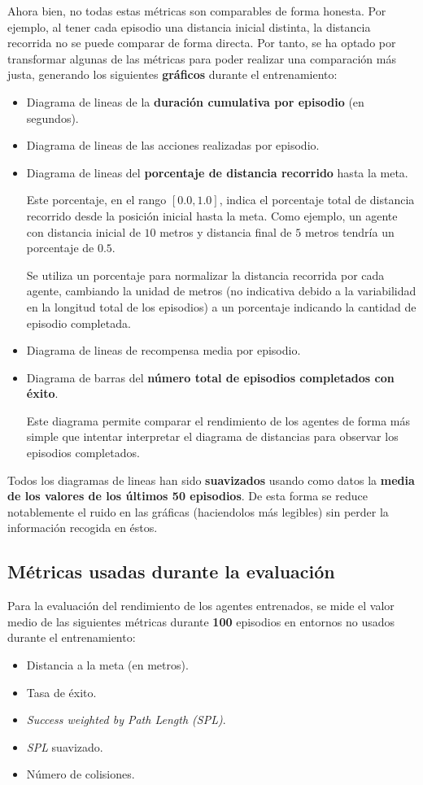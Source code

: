 Ahora bien, no todas estas métricas son comparables de forma honesta. Por ejemplo, al tener cada episodio una distancia inicial distinta, la distancia recorrida no se puede comparar de forma directa. Por tanto, se ha optado por transformar algunas de las métricas para poder realizar una comparación más justa, generando los siguientes \textbf{gráficos} durante el entrenamiento:
\begin{itemize}
	\item Diagrama de lineas de la \textbf{duración cumulativa por episodio} (en segundos).
	\item Diagrama de lineas de las acciones realizadas por episodio.
	\item Diagrama de lineas del \textbf{porcentaje de distancia recorrido} hasta la meta.
	
	Este porcentaje, en el rango $[0.0, 1.0]$, indica el porcentaje total de distancia recorrido desde la posición inicial hasta la meta. Como ejemplo, un agente con distancia inicial de $10$ metros y distancia final de $5$ metros tendría un porcentaje de $0.5$.
	
	Se utiliza un porcentaje para normalizar la distancia recorrida por cada agente, cambiando la unidad de metros (no indicativa debido a la variabilidad en la longitud total de los episodios) a un porcentaje indicando la cantidad de episodio completada.
	\item Diagrama de lineas de recompensa media por episodio.
	\item Diagrama de barras del \textbf{número total de episodios completados con éxito}.
	
	Este diagrama permite comparar el rendimiento de los agentes de forma más simple que intentar interpretar el diagrama de distancias para observar los episodios completados.
\end{itemize}

Todos los diagramas de lineas han sido \textbf{suavizados} usando como datos la \textbf{media de los valores de los últimos 50 episodios}. De esta forma se reduce notablemente el ruido en las gráficas (haciendolos más legibles) sin perder la información recogida en éstos.

\subsection{Métricas usadas durante la evaluación}

Para la evaluación del rendimiento de los agentes entrenados, se mide el valor medio de las siguientes métricas durante \textbf{100} episodios en entornos no usados durante el entrenamiento:
\begin{itemize}
	\item Distancia a la meta (en metros).
	\item Tasa de éxito.
	\item \textit{Success weighted by Path Length (SPL)}.
	\item \textit{SPL} suavizado.
	\item Número de colisiones.
\end{itemize}

